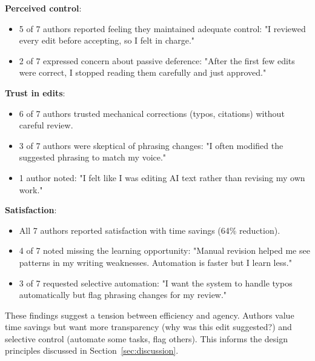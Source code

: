 \textbf{Perceived control}:
\begin{itemize}
\item 5 of 7 authors reported feeling they maintained adequate control: "I reviewed every edit before accepting, so I felt in charge."
\item 2 of 7 expressed concern about passive deference: "After the first few edits were correct, I stopped reading them carefully and just approved."
\end{itemize}

\textbf{Trust in edits}:
\begin{itemize}
\item 6 of 7 authors trusted mechanical corrections (typos, citations) without careful review.
\item 3 of 7 authors were skeptical of phrasing changes: "I often modified the suggested phrasing to match my voice."
\item 1 author noted: "I felt like I was editing AI text rather than revising my own work."
\end{itemize}

\textbf{Satisfaction}:
\begin{itemize}
\item All 7 authors reported satisfaction with time savings (64\% reduction).
\item 4 of 7 noted missing the learning opportunity: "Manual revision helped me see patterns in my writing weaknesses. Automation is faster but I learn less."
\item 3 of 7 requested selective automation: "I want the system to handle typos automatically but flag phrasing changes for my review."
\end{itemize}

These findings suggest a tension between efficiency and agency. Authors value time savings but want more transparency (why was this edit suggested?) and selective control (automate some tasks, flag others). This informs the design principles discussed in Section~\ref{sec:discussion}.